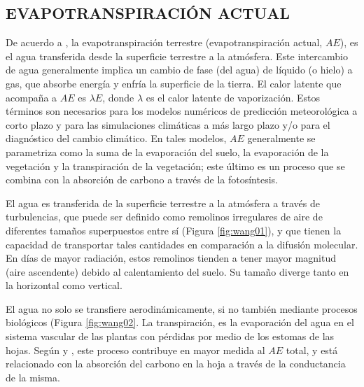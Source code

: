 \documentclass[12pt]{article}
\begin{document}
\thispagestyle{empty}

\subsection{EVAPOTRANSPIRACIÓN ACTUAL}

De acuerdo a \citet{wang2012review}, la evapotranspiración terrestre (evapotranspiración actual, $AE$), es el agua transferida desde la superficie terrestre a la atmósfera. Este intercambio de agua generalmente implica un cambio de fase (del agua) de líquido (o hielo) a gas, que absorbe energía y enfría la superficie de la tierra. El calor latente que acompaña a $AE$ es $\lambda E$, donde $\lambda$ es el calor latente de vaporización. Estos términos son necesarios para los modelos numéricos de predicción meteorológica a corto plazo y para las simulaciones climáticas a más largo plazo y/o para el diagnóstico del cambio climático. En tales modelos, $AE$ generalmente se parametriza como la suma de la evaporación del suelo, la evaporación de la vegetación y la transpiración de la vegetación; este último es un proceso que se combina con la absorción de carbono a través de la fotosíntesis.

\vspace*{.5cm}

\thispagestyle{empty}

\clearpage
El agua es transferida de la superficie terrestre a la atmósfera a través de turbulencias, que puede ser definido como remolinos irregulares de aire de diferentes tamaños superpuestos entre sí (Figura \ref{fig:wang01}), y que tienen la capacidad de transportar tales cantidades en comparación a la difusión molecular. En días de mayor radiación, estos remolinos tienden a tener mayor magnitud (aire ascendente) debido al calentamiento del suelo. Su tamaño diverge tanto en la horizontal como vertical. 

El agua no solo se transfiere aerodinámicamente, si no también mediante procesos biológicos (Figura \ref{fig:wang02}. La transpiración, es la evaporación del agua en el sistema vascular de las plantas con pérdidas por medio de los estomas de las hojas. Según \citet{dirmeyer2006gswp} y \citet{lawrence2007partitioning}, este proceso contribuye en mayor medida al $AE$ total, y está relacionado con la absorción del carbono en la hoja a través de la conductancia de la misma.
\end{document}
